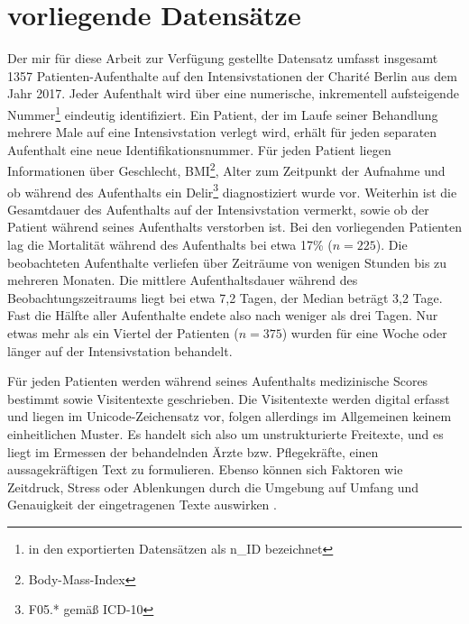 \section{vorliegende Datensätze} \label{section:vorliegende_daten}
Der mir für diese Arbeit zur Verfügung gestellte Datensatz umfasst insgesamt 1357 Patienten-Aufenthalte auf den Intensivstationen der Charité Berlin aus dem Jahr 2017. Jeder Aufenthalt wird über eine numerische, inkrementell aufsteigende Nummer\footnote{in den exportierten Datensätzen als n\_ID bezeichnet} eindeutig identifiziert. Ein Patient, der im Laufe seiner Behandlung mehrere Male auf eine Intensivstation verlegt wird, erhält für jeden separaten Aufenthalt eine neue Identifikationsnummer. Für jeden Patient liegen Informationen über Geschlecht, BMI\footnote{Body-Mass-Index}, Alter zum Zeitpunkt der Aufnahme und ob während des Aufenthalts ein Delir\footnote{F05.* gemäß ICD-10} diagnostiziert wurde vor. Weiterhin ist die Gesamtdauer des Aufenthalts auf der Intensivstation vermerkt, sowie ob der Patient während seines Aufenthalts verstorben ist. Bei den vorliegenden Patienten lag die Mortalität während des Aufenthalts bei etwa 17\% ($n=225$). Die beobachteten Aufenthalte verliefen über Zeiträume von wenigen Stunden bis zu mehreren Monaten. Die mittlere Aufenthaltsdauer während des Beobachtungszeitraums liegt bei etwa 7,2 Tagen, der Median beträgt 3,2 Tage. Fast die Hälfte aller Aufenthalte endete also nach weniger als drei Tagen. Nur etwas mehr als ein Viertel der Patienten ($n=375$) wurden für eine Woche oder länger auf der Intensivstation behandelt.

Für jeden Patienten werden während seines Aufenthalts medizinische Scores  bestimmt sowie Visitentexte geschrieben. Die Visitentexte werden digital erfasst und liegen im Unicode-Zeichensatz vor, folgen allerdings im Allgemeinen keinem einheitlichen Muster. Es handelt sich also um unstrukturierte Freitexte, und es liegt im Ermessen der behandelnden Ärzte bzw. Pflegekräfte, einen aussagekräftigen Text zu formulieren. Ebenso können sich Faktoren wie Zeitdruck, Stress oder Ablenkungen durch die Umgebung auf Umfang und Genauigkeit der eingetragenen Texte auswirken \citep{marxIntensivmedizin2015c}.

